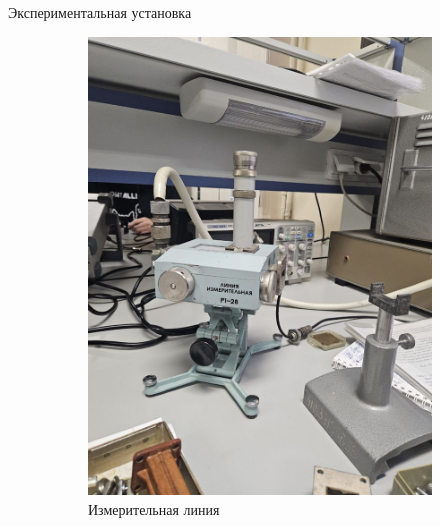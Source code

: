 \documentclass[12pt]{beamer}
\begin{document}
\begin{frame}{Экспериментальная установка}

    \begin{figure}[!h]
        \centering
        \begin{subfigure}{0.5\textwidth} %
            \centering
            \includegraphics[scale=0.08]{photo_2024-12-24_17-45-34 (2).jpg}
            \caption{Измерительная линия}
        \end{subfigure}
        \hfill
        \begin{subfigure}{0.45\textwidth} %
            \centering

\end{subfigure}
\end{figure}
\end{frame}
\end{document}
